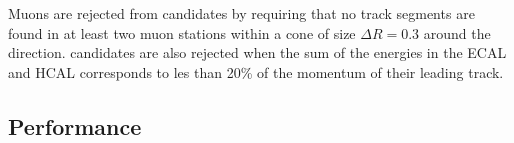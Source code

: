 Muons are rejected from \tauh candidates by requiring that no track segments are found in at least two muon stations within a cone of size $\Delta R = 0.3$ around the \tauh direction. \tauh candidates are also rejected when the sum of the energies in the ECAL and HCAL corresponds to les than 20\% of the momentum of their leading track.

\subsection{Performance}

